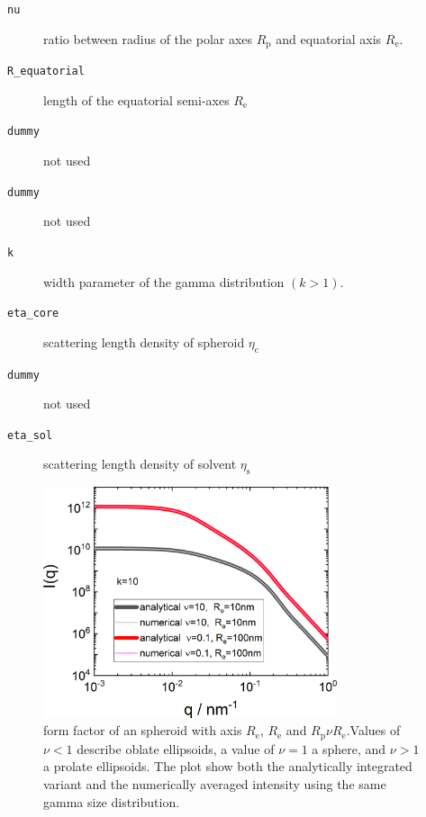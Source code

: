 \begin{description}
\item[\texttt{nu}]
ratio between radius of the polar axes $R_\mathrm{p}$ and equatorial axis $R_\mathrm{e}$.
\item[\texttt{R\_equatorial}] length of the equatorial semi-axes $R_\mathrm{e}$
\item[\texttt{dummy}] not used
\item[\texttt{dummy}] not used
\item[\texttt{k}] width parameter of the gamma distribution $(k>1)$. 
\item[\texttt{eta\_core}] scattering length density of spheroid $\eta_\mathrm{c}$
\item[\texttt{dummy}] not used
\item[\texttt{eta\_sol}] scattering length density of solvent $\eta_\mathrm{s}$
\end{description}

\begin{figure}[htb]
\begin{center}
\includegraphics[width=0.768\textwidth]{../images/form_factor/Ellipsoid/spheroid_w_g_SD.png}
\end{center}
\caption{form factor of an spheroid with axis $R_\mathrm{e}$, $R_\mathrm{e}$ and $R_\mathrm{p}\nu
R_\mathrm{e}$.Values of $\nu<1$ describe oblate ellipsoids, a value of $\nu=1$ a
sphere, and $\nu>1$ a prolate ellipsoids. The plot show both the analytically integrated variant and the numerically averaged intensity using the same gamma size distribution.} \label{fig:I_spheroid_w_gSD}
\end{figure}

\newpage

